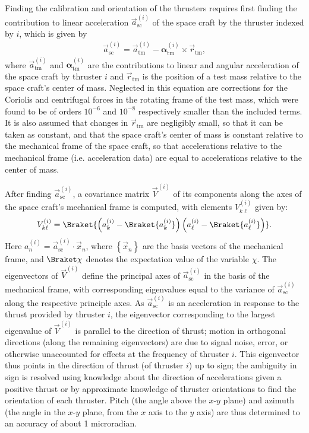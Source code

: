 \documentclass[10pt,twocolumn]{article}
\renewcommand{\t}{\text} %
\renewcommand{\c}{\cdot} %
\newcommand{\p}[1]{\left(#1\right)} %
\newcommand{\set}[1]{\left\{#1\right\}} %
\renewcommand{\v}{\vec} %
\renewcommand{\braket}{\Braket} %
\newcommand{\bk}{\braket} %
\renewcommand{\l}{\ell} %
\renewcommand{\sc}{_{\t{sc}}}
\newcommand{\tm}{_{\t{tm}}}
\newcommand{\ti}{^{\p{i}}}
\begin{document}
Finding the calibration and orientation of the thrusters requires
first finding the contribution to linear acceleration $\v a\ti\sc$ of
the space craft by the thruster indexed by $i$, which is given by
\begin{align}
  \v a\ti\sc=\v a\ti\tm-\boldsymbol\alpha\ti\tm\times\v r\tm,
\end{align}
where $\v a\ti\tm$ and $\boldsymbol\alpha\ti\tm$ are the contributions
to linear and angular acceleration of the space craft by thruster $i$
and $\v r\tm$ is the position of a test mass relative to the space
craft's center of mass. Neglected in this equation are corrections for
the Coriolis and centrifugal forces in the rotating frame of the test
mass, which were found to be of orders $10^{-6}$ and $10^{-8}$
respectively smaller than the included terms. It is also assumed that
changes in $\v r\tm$ are negligibly small, so that it can be taken as
constant, and that the space craft's center of mass is constant
relative to the mechanical frame of the space craft, so that
accelerations relative to the mechanical frame (i.e. acceleration
data) are equal to accelerations relative to the center of mass.

After finding $\v a\sc\ti$, a covariance matrix $\v V\ti$ of its
components along the axes of the space craft's mechanical frame is
computed, with elements $V_{k\l}\ti$ given by:
\begin{align}
  V_{k\l}\ti=\bk{\p{a\ti_k-\bk{a\ti_k}}\p{a\ti_\l-\bk{a\ti_\l}}}.
\end{align}
Here $a\ti_n=\v a\sc\ti\c\v x_n$, where $\set{\v x_n}$ are the basis
vectors of the mechanical frame, and $\bk\chi$ denotes the expectation
value of the variable $\chi$. The eigenvectors of $\v V\ti$ define the
principal axes of $\v a\sc\ti$ in the basis of the mechanical frame,
with corresponding eigenvalues equal to the variance of $\v a\sc\ti$
along the respective principle axes. As $\v a\sc\ti$ is an
acceleration in response to the thrust provided by thruster $i$, the
eigenvector corresponding to the largest eigenvalue of $\v V\ti$ is
parallel to the direction of thrust; motion in orthogonal directions
(along the remaining eigenvectors) are due to signal noise, error, or
otherwise unaccounted for effects at the frequency of thruster
$i$. This eigenvector thus points in the direction of thrust (of
thruster $i$) up to sign; the ambiguity in sign is resolved using
knowledge about the direction of accelerations given a positive thrust
or by approximate knowledge of thruster orientations to find the
orientation of each thruster. Pitch (the angle above the $x$-$y$
plane) and azimuth (the angle in the $x$-$y$ plane, from the $x$ axis
to the $y$ axis) are thus determined to an accuracy of about 1
microradian.
\end{document}
